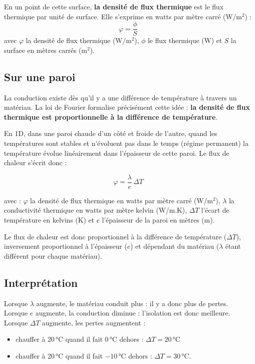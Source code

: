 En un point de cette surface, \textbf{la densité de flux thermique} est le flux thermique par unité de surface. Elle s'exprime en watts par mètre carré (W/m$^2$) :
\begin{equation}
  \varphi = \frac{\phi}{S}
\end{equation}
avec $\varphi$ la densité de flux thermique (W/m$^2$), $\phi$ le flux thermique (W) et $S$ la surface en mètres carrés (m$^2$).

\subsection*{Sur une paroi}
La conduction existe dès qu'il y a une différence de température à travers un matériau.
La loi de Fourier formalise précisément cette idée :
\textbf{la densité de flux thermique est proportionnelle à la différence de température}.

En 1D, dans une paroi chaude d'un côté et froide de l'autre, quand les températures sont stables et n'évoluent pas dans le temps (régime permanent) la température évolue linéairement dans l'épaisseur de cette paroi. Le flux de chaleur s'écrit donc :

\begin{equation}
  \varphi = \frac{\lambda}{e}\,\Delta T
\end{equation}

avec :
$\varphi$ la densité de flux thermique en watts par mètre carré (W/m$^2$), $\lambda$ la conductivité thermique en watts par mètre kelvin (W/m.K), $\Delta T$ l'écart de température en kelvins (K) et $e$ l'épaisseur de la paroi en mètres (m).



Le flux de chaleur est donc proportionnel à la différence de température ($\Delta T$), inversement proportionnel à l'épaisseur ($e$) et dépendant du matériau ($\lambda$ étant différent pour chaque matériau).

\subsection*{Interprétation}
Lorsque $\lambda$ augmente, le matériau conduit plus : il y a donc plus de pertes. Lorsque $e$ augmente, la conduction diminue : l'isolation est donc meilleure. Lorsque $\Delta T$ augmente, les pertes augmentent :
  \begin{itemize}
    \item chauffer à 20\,°C quand il fait 0\,°C dehors : $\Delta T = 20$\,°C
    \item chauffer à 20\,°C quand il fait $-10$\,°C dehors : $\Delta T = 30$\,°C.
  \end{itemize}


